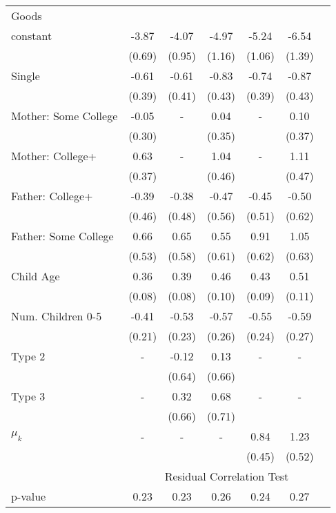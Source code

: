\begin{tabular}{lcccccc}
Goods}\\\cmidrule(r){2-7}constant&-3.87&-4.07&-4.97&-5.24&-6.54&\\&(0.69)&(0.95)&(1.16)&(1.06)&(1.39)&\\Single&-0.61&-0.61&-0.83&-0.74&-0.87&\\&(0.39)&(0.41)&(0.43)&(0.39)&(0.43)&\\Mother: Some College&-0.05&-&0.04&-&0.10&\\&(0.30)&&(0.35)&&(0.37)&\\Mother: College+&0.63&-&1.04&-&1.11&\\&(0.37)&&(0.46)&&(0.47)&\\Father: College+&-0.39&-0.38&-0.47&-0.45&-0.50&\\&(0.46)&(0.48)&(0.56)&(0.51)&(0.62)&\\Father: Some College&0.66&0.65&0.55&0.91&1.05&\\&(0.53)&(0.58)&(0.61)&(0.62)&(0.63)&\\Child Age&0.36&0.39&0.46&0.43&0.51&\\&(0.08)&(0.08)&(0.10)&(0.09)&(0.11)&\\Num. Children 0-5&-0.41&-0.53&-0.57&-0.55&-0.59&\\&(0.21)&(0.23)&(0.26)&(0.24)&(0.27)&\\Type 2&-&-0.12&0.13&-&-&\\&&(0.64)&(0.66)&&&\\Type 3&-&0.32&0.68&-&-&\\&&(0.66)&(0.71)&&&\\$\mu_{k}$&-&-&-&0.84&1.23&\\&&&&(0.45)&(0.52)&\\& \multicolumn{6}{c}{Residual Correlation Test}\\\cmidrule(r){2-7}p-value&0.23&0.23&0.26&0.24&0.27&\\
\bottomrule\end{tabular}